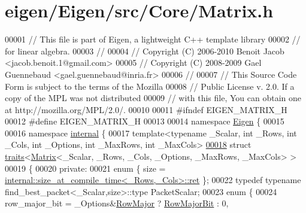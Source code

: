 \hypertarget{eigen_2_eigen_2src_2_core_2_matrix_8h_source}{}\section{eigen/\+Eigen/src/\+Core/\+Matrix.h}
\label{eigen_2_eigen_2src_2_core_2_matrix_8h_source}

\begin{DoxyCode}
00001 \textcolor{comment}{// This file is part of Eigen, a lightweight C++ template library}
00002 \textcolor{comment}{// for linear algebra.}
00003 \textcolor{comment}{//}
00004 \textcolor{comment}{// Copyright (C) 2006-2010 Benoit Jacob <jacob.benoit.1@gmail.com>}
00005 \textcolor{comment}{// Copyright (C) 2008-2009 Gael Guennebaud <gael.guennebaud@inria.fr>}
00006 \textcolor{comment}{//}
00007 \textcolor{comment}{// This Source Code Form is subject to the terms of the Mozilla}
00008 \textcolor{comment}{// Public License v. 2.0. If a copy of the MPL was not distributed}
00009 \textcolor{comment}{// with this file, You can obtain one at http://mozilla.org/MPL/2.0/.}
00010 
00011 \textcolor{preprocessor}{#ifndef EIGEN\_MATRIX\_H}
00012 \textcolor{preprocessor}{#define EIGEN\_MATRIX\_H}
00013 
00014 \textcolor{keyword}{namespace }\hyperlink{namespace_eigen}{Eigen} \{
00015 
00016 \textcolor{keyword}{namespace }\hyperlink{namespaceinternal}{internal} \{
00017 \textcolor{keyword}{template}<\textcolor{keyword}{typename} \_Scalar, \textcolor{keywordtype}{int} \_Rows, \textcolor{keywordtype}{int} \_Cols, \textcolor{keywordtype}{int} \_Options, \textcolor{keywordtype}{int} \_MaxRows, \textcolor{keywordtype}{int} \_MaxCols>
\hyperlink{struct_eigen_1_1internal_1_1traits_3_01_matrix_3_01___scalar_00_01___rows_00_01___cols_00_01___o4c9772ffb3eee7280611af9a479b3583}{00018} \textcolor{keyword}{struct }\hyperlink{struct_eigen_1_1internal_1_1traits}{traits}<\hyperlink{group___core___module_class_eigen_1_1_matrix}{Matrix}<\_Scalar, \_Rows, \_Cols, \_Options, \_MaxRows, \_MaxCols> >
00019 \{
00020 \textcolor{keyword}{private}:
00021   \textcolor{keyword}{enum} \{ size = \hyperlink{struct_eigen_1_1internal_1_1size__at__compile__time}{internal::size\_at\_compile\_time<\_Rows,\_Cols>::ret}
       \};
00022   \textcolor{keyword}{typedef} \textcolor{keyword}{typename} find\_best\_packet<\_Scalar,size>::type PacketScalar;
00023   \textcolor{keyword}{enum} \{
00024       row\_major\_bit = \_Options&\hyperlink{group__enums_ggaacded1a18ae58b0f554751f6cdf9eb13acfcde9cd8677c5f7caf6bd603666aae3}{RowMajor} ? \hyperlink{group__flags_gae4f56c2a60bbe4bd2e44c5b19cbe8762}{RowMajorBit} : 0,

\end{DoxyCode}
